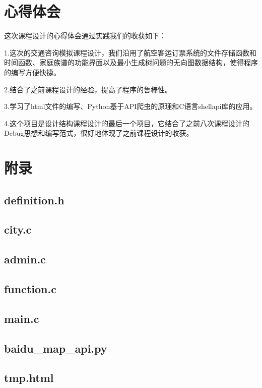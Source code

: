 \documentclass{DateStructure}
\begin{document}
\section{心得体会}
这次课程设计的心得体会通过实践我们的收获如下：\par
1.这次的交通咨询模拟课程设计，我们沿用了航空客运订票系统的文件存储函数和时间函数、家庭族谱的功能界面以及最小生成树问题的无向图数据结构，使得程序的编写方便快捷。\par
2.结合了之前课程设计的经验，提高了程序的鲁棒性。\par
3.学习了html文件的编写、Python基于API爬虫的原理和C语言shellapi库的应用。\par
4.这个项目是设计结构课程设计的最后一个项目，它结合了之前八次课程设计的Debug思想和编写范式，很好地体现了之前课程设计的收获。\par

\newpage 
\section{附录}
\subsection{definition.h}

\subsection{city.c}

\subsection{admin.c}

\subsection{function.c}

\subsection{main.c}

\subsection{baidu\_map\_api.py}

\subsection{tmp.html}

\end{document}
